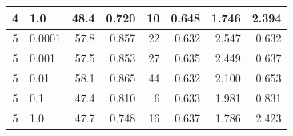 \documentclass[12pt]{jarticle}
\numberwithin{equation}{section}    %
\numberwithin{figure}{section}      %
\numberwithin{table}{section}      %
\begin{document}
\begin{table}[bt]
\begin{center}
{\begin{tabular}{|c|l|rrrrrr|}
                4                        & 1.0                                      & 48.4                         & 0.720                     & 10                         & 0.648                         & 1.746                             & 2.394                    \\
                \hline
                5                        & 0.0001                                   & 57.8                         & 0.857                     & 22                         & 0.632                         & 2.547                             & 0.632                    \\
                5                        & 0.001                                    & 57.5                         & 0.853                     & 27                         & 0.635                         & 2.449                             & 0.637                    \\
                5                        & 0.01                                     & 58.1                         & 0.865                     & 44                         & 0.632                         & 2.100                             & 0.653                    \\
                5                        & 0.1                                      & 47.4                         & 0.810                     & 6                          & 0.633                         & 1.981                             & 0.831                    \\
                5                        & 1.0                                      & 47.7                         & 0.748                     & 16                         & 0.637                         & 1.786                             & 2.423                    \\
                \hline
            \end{tabular}
        }
    \end{center}
\end{table}
\end{document}
